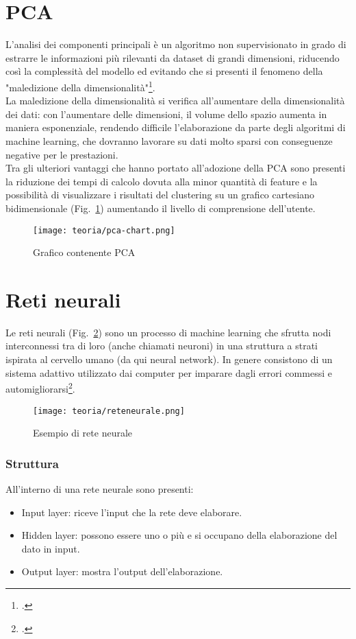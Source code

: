 \section{PCA}
L'analisi dei componenti principali è un algoritmo non supervisionato in grado di estrarre le informazioni più rilevanti da dataset di grandi dimensioni, riducendo così la complessità del modello ed evitando che si presenti il fenomeno della "maledizione della dimensionalità"\footcite{site:PCA}.\\La maledizione della dimensionalità si verifica all'aumentare della dimensionalità dei dati: con l'aumentare delle dimensioni, il volume dello spazio aumenta in maniera esponenziale, rendendo difficile l'elaborazione da parte degli algoritmi di machine learning, che dovranno lavorare su dati molto sparsi con conseguenze negative per le prestazioni.\\Tra gli ulteriori vantaggi che hanno portato all'adozione della PCA sono presenti la riduzione dei tempi di calcolo dovuta alla minor quantità di feature e la possibilità di visualizzare i risultati del clustering su un grafico cartesiano bidimensionale (Fig.~\ref{fig:pca-chart}) aumentando il livello di comprensione dell'utente.

\begin{figure}[!h] 
    \centering 
    \texttt{[image: teoria/pca-chart.png]} 
    \caption{Grafico contenente PCA}
    \label{fig:pca-chart}
  \end{figure}

\newpage

\section{Reti neurali}
Le reti neurali (Fig.~\ref{fig:rete-neurale}) sono un processo di machine learning che sfrutta nodi interconnessi tra di loro (anche chiamati neuroni) in una struttura a strati ispirata al cervello umano (da qui neural network).
In genere consistono di un sistema adattivo utilizzato dai computer per imparare dagli errori commessi e automigliorarsi\footcite{site:rete-neurale}.

\begin{figure}[!h] 
    \centering 
    \texttt{[image: teoria/reteneurale.png]} 
    \caption{Esempio di rete neurale}
    \label{fig:rete-neurale}
  \end{figure}

\subsubsection{Struttura}
All'interno di una rete neurale sono presenti:
\begin{itemize}
    \item Input layer: riceve l'input che la rete deve elaborare.
    \item Hidden layer: possono essere uno o più e si occupano della elaborazione del dato in input.
    \item Output layer: mostra l'output dell'elaborazione.
\end{itemize}

